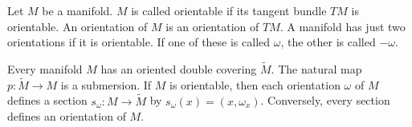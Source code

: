 Let $M$ be a manifold. $M$ is called orientable if its tangent bundle $TM$ is orientable. An orientation of $M$ is an orientation of $TM$. A manifold has just two orientations if it is orientable. If one of these is called $\omega$, the other is called $-\omega$.

Every manifold $M$ has an oriented double covering $\tilde{M}$. The natural map $p: \tilde{M} \rightarrow M$ is a submersion. If $M$ is orientable, then each orientation $\omega$ of $M$ defines a section $s_\omega: M \rightarrow \tilde{M}$ by $s_\omega(x) = (x, \omega_x)$. Conversely, every section defines an orientation of $M$.
